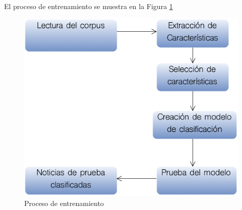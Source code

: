 El proceso de entrenamiento se muestra en la Figura \ref{fig:clasificacion}

\begin{figure}[h]
\centering
\includegraphics[scale=0.35]{imagenes/Resultados/Clasificacion.png}
\caption{Proceso de entrenamiento}
\label{fig:clasificacion}
\end{figure}

